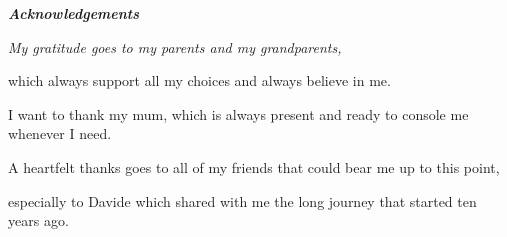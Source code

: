 
\thispagestyle{empty}

\begin{center}
  {\bf \Huge  \emph{Acknowledgements}}
\end{center}
\vspace{4cm}
{\em \centering
My gratitude goes to my parents and my grandparents,

which always support all my choices and always believe in me.

I want to thank my mum, which is always present and ready to console me whenever I need.

A heartfelt thanks goes to all of my friends that could bear me up to this point,

especially to Davide which shared with me the long journey that started ten years ago.

}
